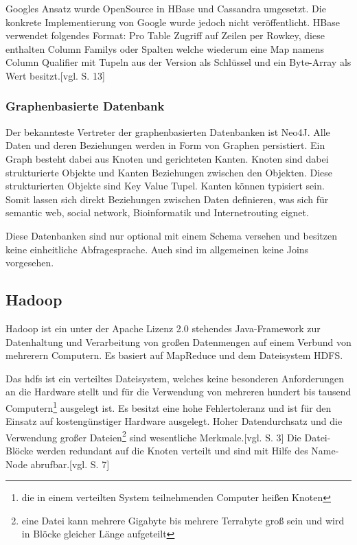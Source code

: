 Googles Ansatz wurde OpenSource in HBase und Cassandra umgesetzt. Die konkrete Implementierung von Google wurde jedoch nicht veröffentlicht.
HBase verwendet folgendes Format: Pro Table Zugriff auf Zeilen per Rowkey, diese enthalten Column Familys oder Spalten welche wiederum eine Map namens Column Qualifier mit Tupeln aus der Version als Schlüssel und ein Byte-Array als Wert besitzt.[vgl. \cite{ba:dan} S. 13]

\subsubsection{Graphenbasierte Datenbank}

Der bekannteste Vertreter der graphenbasierten Datenbanken ist Neo4J.
Alle Daten und deren Beziehungen werden in Form von Graphen persistiert.
Ein Graph besteht dabei aus Knoten und gerichteten Kanten.
Knoten sind dabei strukturierte Objekte und Kanten Beziehungen zwischen den Objekten.
Diese strukturierten Objekte sind Key Value Tupel.
Kanten können typisiert sein.
Somit lassen sich direkt Beziehungen zwischen Daten definieren, was sich für semantic web, social network, Bioinformatik und Internetrouting eignet.

Diese Datenbanken sind nur optional mit einem Schema versehen und besitzen keine einheitliche Abfragesprache.
Auch sind im allgemeinen keine Joins vorgesehen.


\subsection{Hadoop}

Hadoop ist ein unter der Apache Lizenz 2.0 stehendes Java-Framework zur Datenhaltung und Verarbeitung von großen Datenmengen auf einem Verbund von mehrerern Computern.
Es basiert auf MapReduce und dem Dateisystem HDFS.

Das \Gls{hdfs} ist ein verteiltes Dateisystem, welches keine besonderen Anforderungen an die Hardware stellt und für die Verwendung von mehreren hundert bis tausend Computern\footnote{die in einem verteilten System teilnehmenden Computer heißen Knoten} ausgelegt ist.
Es besitzt eine hohe Fehlertoleranz und ist für den Einsatz auf kostengünstiger Hardware ausgelegt.
Hoher Datendurchsatz und die Verwendung großer Dateien\footnote{eine Datei kann mehrere Gigabyte bis mehrere Terrabyte groß sein und wird in Blöcke gleicher Länge aufgeteilt} sind wesentliche Merkmale.[vgl. \cite{paper:hadoop} S. 3]
Die Datei-Blöcke werden redundant auf die Knoten verteilt und sind mit Hilfe des Name-Node abrufbar.[vgl. \cite{ba:dan} S. 7]

